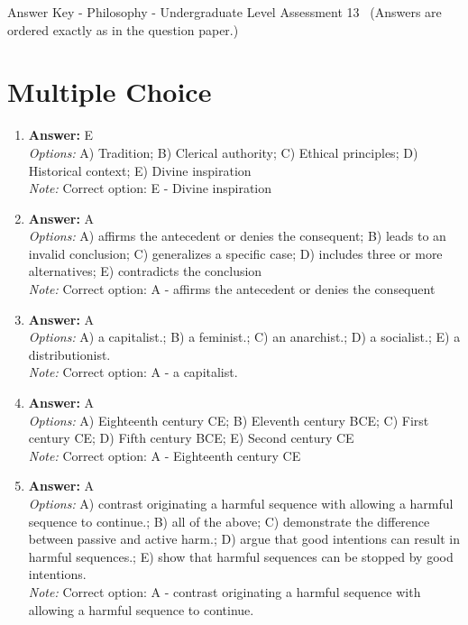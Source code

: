 \documentclass[12pt]{article}
\begin{document}
\begin{center}
Answer Key - Philosophy - Undergraduate Level Assessment 13 \
\small (Answers are ordered exactly as in the question paper.)
\end{center}

\section*{Multiple Choice}
\begin{enumerate}[label=\arabic*.]
\item \textbf{Answer:} E
\\ \textit{Options:} A) Tradition; B) Clerical authority; C) Ethical principles; D) Historical context; E) Divine inspiration
\\ \textit{Note:} Correct option: E - Divine inspiration
\item \textbf{Answer:} A
\\ \textit{Options:} A) affirms the antecedent or denies the consequent; B) leads to an invalid conclusion; C) generalizes a specific case; D) includes three or more alternatives; E) contradicts the conclusion
\\ \textit{Note:} Correct option: A - affirms the antecedent or denies the consequent
\item \textbf{Answer:} A
\\ \textit{Options:} A) a capitalist.; B) a feminist.; C) an anarchist.; D) a socialist.; E) a distributionist.
\\ \textit{Note:} Correct option: A - a capitalist.
\item \textbf{Answer:} A
\\ \textit{Options:} A) Eighteenth century CE; B) Eleventh century BCE; C) First century CE; D) Fifth century BCE; E) Second century CE
\\ \textit{Note:} Correct option: A - Eighteenth century CE
\item \textbf{Answer:} A
\\ \textit{Options:} A) contrast originating a harmful sequence with allowing a harmful sequence to continue.; B) all of the above; C) demonstrate the difference between passive and active harm.; D) argue that good intentions can result in harmful sequences.; E) show that harmful sequences can be stopped by good intentions.
\\ \textit{Note:} Correct option: A - contrast originating a harmful sequence with allowing a harmful sequence to continue.
\end{enumerate}
\end{document}
